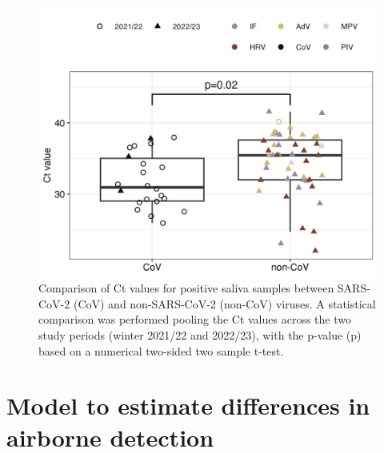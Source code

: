\documentclass[fleqn,11pt]{wlscirep_supp}
\begin{document}
\clearpage

\begin{figure}[!htpb]
    \centering
    \includegraphics{results/comparison-viral-loads.png}
    \caption{Comparison of Ct values for positive saliva samples between SARS-CoV-2 (CoV) and non-SARS-CoV-2 (non-CoV) viruses. A statistical comparison was performed pooling the Ct values across the two study periods (winter 2021/22 and 2022/23), with the p-value (p) based on a numerical two-sided two sample t-test.}
    \label{fig:viral-loads}
\end{figure}

\clearpage

\section*{Model to estimate differences in airborne detection}\label{sec:model}
\end{document}

